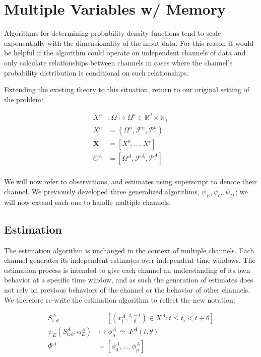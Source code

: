 \documentclass[10pt]{article}
\begin{document}
\section{Multiple Variables w/ Memory}
Algorithms for determining probability density functions tend to scale exponentially with the dimensionality of the input data.  For this reason it would be helpful if the algorithm could operate on independent channels of data and only calculate relationships between channels in cases where the channel's probability distribution is conditional on such relationships.

Extending the existing theory to this situation, return to our original setting of the problem:

\begin{align*}
X^n &: \Omega \mapsto \Omega^n \in \mathbb{R}^d \times \mathbb{R}_+ \\
X^n &= (\Omega^n,\mathcal{F}^n,\mathcal{P}^n) \\
\mathbf{X} &= [X^0,...,X^c]   \\
C^A &= [\Omega^A,\mathcal{F}^A,\mathcal{P}^A] \\
\end{align*}

We will now refer to observations, and estimates using superscript to denote their channel.  We previously developed three generalized algorithms, \(\psi_E, \psi_C, \psi_D \,\!\); we will now extend each one to handle multiple channels.

\subsection{Estimation}
The estimation algorithm is unchanged in the context of multiple channels.  Each channel generates its independent estimates over independent time windows.  The estimation process is intended to give each channel an understanding of its own behavior at a specific time window, and as such the generation of estimates does not rely on previous behaviors of the channel or the behavior of other channels.  We therefore re-write the estimation algorithm to reflect the new notation:

\begin{align*}
S_{t,\theta}^A &= [ (x_i^A,\frac{t_i - t}{\theta}) \in X^A : t \le t_i < t+\theta ] \\
\psi_E( S_{t,\theta}^A:\alpha_E^A ) &\mapsto \phi_n^A \ \simeq \ F^A(t,\theta)  \\
\Phi^A &= [\phi_0^A,...,\phi_p^A ] \\
\end{align*}
\end{document}

